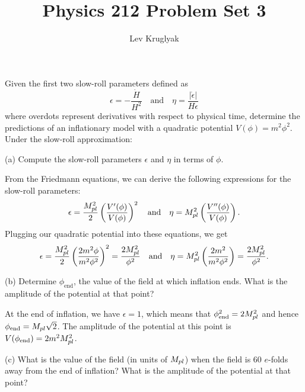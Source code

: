 \documentclass{lkx_pset}
\title{Physics 212 Problem Set 3}
\author{Lev Kruglyak}
\begin{document}
\maketitle

\begin{problem}{1}
  Given the first two slow-roll parameters defined as
  \[
    \epsilon = -\frac{\dot{H}}{H^2}\quad\textrm{and}\quad \eta = \frac{|\dot{\epsilon}|}{H\epsilon}
  \]
  where overdots represent derivatives with respect to physical time, determine the predictions of an inflationary model with a quadratic potential $V(\phi)=m^2\phi^2$. Under the slow-roll approximation:
\end{problem}

\begin{parts}
  \begin{part}{(a)}
    Compute the slow-roll parameters $\epsilon$ and $\eta$ in terms of $\phi$.
  \end{part}

  From the Friedmann equations, we can derive the following expressions for the slow-roll parameters:
  \[
    \epsilon = \frac{M_{pl}^2}{2}\left(\frac{V'(\phi)}{V(\phi)}\right)^2\quad\textrm{and}\quad
    \eta = M_{pl}^2\left(\frac{V''(\phi)}{V(\phi)}\right).
  \]
  Plugging our quadratic potential into these equations, we get
  \[
    \epsilon = \frac{M_{pl}^2}{2}\left(\frac{2m^2\phi}{m^2\phi^2}\right)^2=\frac{2M_{pl}^2}{\phi^2}
    \quad\textrm{and}\quad
    \eta = M_{pl}^2\left(\frac{2m^2}{m^2\phi^2}\right)=\frac{2M_{pl}^2}{\phi^2}.
  \]

  \begin{part}{(b)}
    Determine $\phi_{\textrm{end}}$, the value of the field at which inflation ends. What is the amplitude of the potential at that point?
  \end{part}
  At the end of inflation, we have $\epsilon=1$, which means that $\phi^2_{\textrm{end}}=2M_{pl}^2$ and hence $\phi_{\textrm{end}}=M_{pl}\sqrt{2}$. The amplitude of the potential at this point is $V(\phi_{\textrm{end}}) =2m^2M_{pl}^2$.

  \begin{part}{(c)}
    What is the value of the field (in units of $M_{pl}$) when the field is 60 $e$-folds away from the end of inflation? What is the amplitude of the potential at that point?
  \end{part}


\end{parts}
\end{document}
